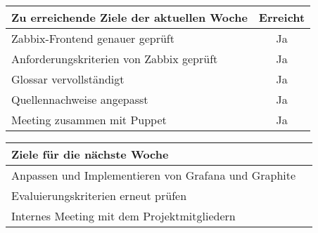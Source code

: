 \begin{tabularx}{\textwidth}{Xc}
    \arrayrulecolor{OliveGreen}
    \toprule
    {\bfseries Zu erreichende Ziele der aktuellen Woche} & {\bfseries Erreicht} \\
    \midrule[2pt]
    Zabbix-Frontend genauer geprüft                         &Ja              \\
    \rowcolor{OliveGreen!15}
    Anforderungskriterien von Zabbix geprüft                &Ja              \\
    \rowcolor{White}
    Glossar vervollständigt                                 &Ja              \\
    \rowcolor{OliveGreen!15}
    Quellennachweise angepasst                              &Ja              \\
    \rowcolor{White}
    Meeting zusammen mit Puppet                             &Ja              \\
    \bottomrule[2pt]
\end{tabularx}
%
\vspace{1cm}
%
\begin{tabularx}{\textwidth}{Xc}
    \arrayrulecolor{OliveGreen}
    \toprule
    {\bfseries Ziele für die nächste Woche}        &                         \\
    \midrule[2pt]
    Anpassen und Implementieren von Grafana und Graphite  &                  \\
    \rowcolor{OliveGreen!15}
    Evaluierungskriterien erneut prüfen            &                         \\
    \rowcolor{White}
    Internes Meeting mit dem Projektmitgliedern    &                         \\
\end{tabularx}
